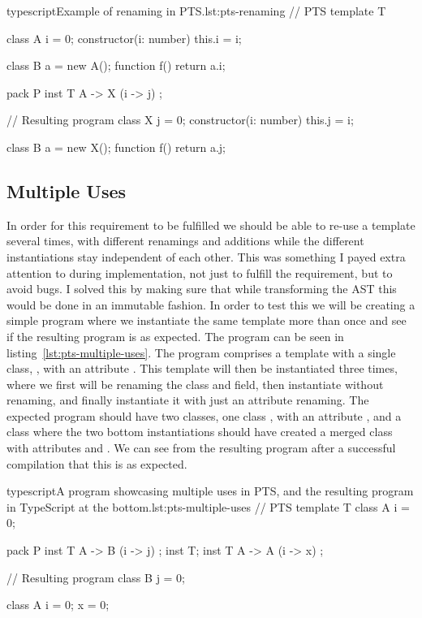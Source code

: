 \begin{code}{typescript}{Example of renaming in PTS.}{lst:pts-renaming}
    // PTS
    template T {
        class A {
            i = 0;
            constructor(i: number) {
                this.i = i;
            }
        }

        class B {
            a = new A();
            function f() {
                return a.i;
            }
        }
    }

    pack P {
        inst T { A -> X (i -> j) };
    }

    // Resulting program
    class X {
        j = 0;
        constructor(i: number) {
            this.j = i;
        }
    }

    class B {
        a = new X();
        function f() {
            return a.j;
        }
    }
\end{code}

\subsection{Multiple Uses}\label{subsec:pts-multiple-uses}

In order for this requirement to be fulfilled we should be able to re-use a template several times, with different renamings and additions while the different instantiations stay independent of each other.
This was something I payed extra attention to during implementation, not just to fulfill the requirement, but to avoid bugs.
I solved this by making sure that while transforming the AST this would be done in an immutable fashion.
In order to test this we will be creating a simple program where we instantiate the same template more than once and see if the resulting program is as expected.
The program can be seen in listing~\vref{lst:pts-multiple-uses}.
The program comprises a template  with a single class, , with an attribute .
This template will then be instantiated three times, where we first will be renaming the class and field, then instantiate without renaming, and finally instantiate it with just an attribute renaming.
The expected program should have two classes, one class , with an attribute , and a class  where the two bottom instantiations should have created a merged class with attributes  and .
We can see from the resulting program after a successful compilation that this is as expected.

\begin{code}{typescript}{A program showcasing multiple uses in PTS, and the resulting program in TypeScript at the bottom.}{lst:pts-multiple-uses}
    // PTS
    template T {
        class A {
            i = 0;
        }
    }

    pack P {
        inst T { A -> B (i -> j) };
        inst T;
        inst T { A -> A (i -> x) };
    }

    // Resulting program
    class B {
        j = 0;
    }

    class A {
        i = 0;
        x = 0;
    }
\end{code}

